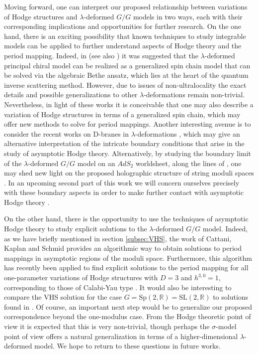 \documentclass[11pt,a4paper]{article}
\numberwithin{equation}{section}
\numberwithin{table}{section}\setlength{\multlinegap}{25pt}
\begin{document}
Moving forward, one can interpret our proposed relationship between variations of Hodge structures and $\lambda$-deformed $G/G$ models in two ways, each with their corresponding implications and opportunities for further research. On the one hand, there is an exciting possibility that known techniques to study integrable models can be applied to further understand aspects of Hodge theory and the period mapping. Indeed, in \cite{Appadu:2017fff} (see also \cite{Destri:1988,Destri:1989,Delduc:2012qb,Delduc:2012vq}) it was suggested that the $\lambda$-deformed principal chiral model can be realized as a generalized spin chain model that can be solved via the algebraic Bethe ansatz, which lies at the heart of the quantum inverse scattering method. However, due to issues of non-ultralocality the exact details and possible generalizations to other $\lambda$-deformations remain non-trivial. Nevertheless, in light of these works it is conceivable that one may also describe a variation of Hodge structures in terms of a generalized spin chain, which may offer new methods to solve for period mappings. Another interesting avenue is to consider the recent works on D-branes in $\lambda$-deformations \cite{Driezen:2018glg,Sfetsos:2021pcs}, which may give an alternative interpretation of the intricate boundary conditions that arise in the study of asymptotic Hodge theory. Alternatively, by studying the boundary limit of the $\lambda$-deformed $G/G$ model on an $AdS_2$ worldsheet, along the lines of \cite{Beccaria:2020qtk}, one may shed new light on the proposed holographic structure of string moduli spaces \cite{Grimm:2021ikg}. In an upcoming second part of this work we will concern ourselves precisely with these boundary aspects in order to make further contact with asymptotic Hodge theory \cite{Grimm_WZW_II}.

On the other hand, there is the opportunity to use the techniques of asymptotic Hodge theory to study explicit solutions to the $\lambda$-deformed $G/G$ model. Indeed, as we have briefly mentioned in section \ref{subsec:VHS}, the work of Cattani, Kaplan and Schmid \cite{CKS} provides an algorithmic way to obtain solutions to period mappings in asymptotic regions of the moduli space. Furthermore, this algorithm has recently been applied to find explicit solutions to the period mapping for all one-parameter variations of Hodge structures with $D=3$ and $h^{3,0}=1$, corresponding to those of Calabi-Yau type \cite{Grimm:2021ikg}. It would also be interesting to compare the VHS solution for the case $G=\mathrm{Sp}(2,\mathbb{R})=\mathrm{SL}(2,\mathbb{R})$ to solutions found in \cite{Katsinis:2021nfu}. Of course, an important next step would be to generalize our proposed correspondence beyond the one-modulus case. From the Hodge theoretic point of view it is expected that this is very non-trivial, though perhaps the $\sigma$-model point of view offers a natural generalization in terms of a higher-dimensional $\lambda$-deformed model. We hope to return to these questions in future works. 
\end{document}

